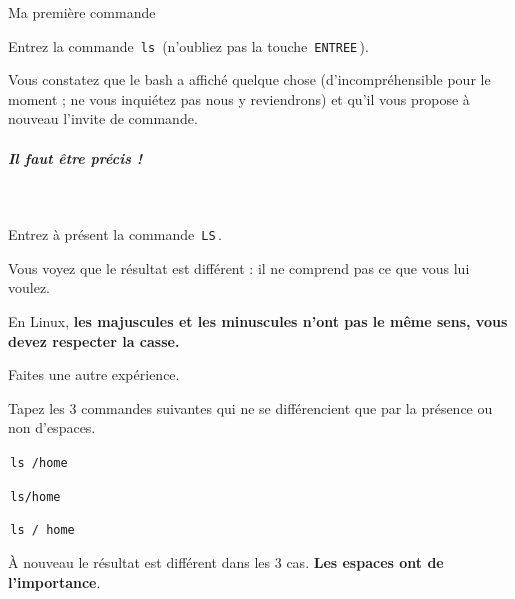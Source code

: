 \documentclass[a4paper,11pt]{article}
\begin{document}
\begin{Tutoriel}{Ma premi\`ere commande}
\begin{steps}
\item Entrez la commande \,\verb|ls|\, (n'oubliez pas la touche \,\verb|ENTREE|\,).
\end{steps}				
\par
        
Vous constatez que le bash a affich\'e quelque chose (d'incompr\'ehensible pour le moment ; ne vous inqui\'etez pas nous y reviendrons) et qu'il vous propose \`a nouveau l'invite de commande.
				
\par
        
			
\subparagraph{Il faut \^etre pr\'ecis !} 
\textcolor{white}{.} \par
\begin{steps}
\item Entrez \`a pr\'esent  la commande \,\verb|LS|\,.
\end{steps}
				
\par
        
Vous voyez que le r\'esultat est diff\'erent : il ne comprend pas ce que vous lui voulez.
        
\par
        
En Linux, \textbf{les majuscules et les minuscules n'ont pas le m\^eme sens, vous devez respecter la casse.}
\par
        
Faites une autre exp\'erience. 
        
\par
        
Tapez les 3 commandes suivantes qui ne se diff\'erencient que par la pr\'esence ou non d'espaces.
				
\par
        
\begin{steps}
				
\item \,\verb|ls /home|\,
\item \,\verb|ls/home|\,
\item \,\verb|ls / home|\,

\end{steps}
				
\`A nouveau le r\'esultat est diff\'erent dans les 3 cas. \textbf{Les espaces ont de l'importance}.
\end{Tutoriel}				
\par
\end{document}
